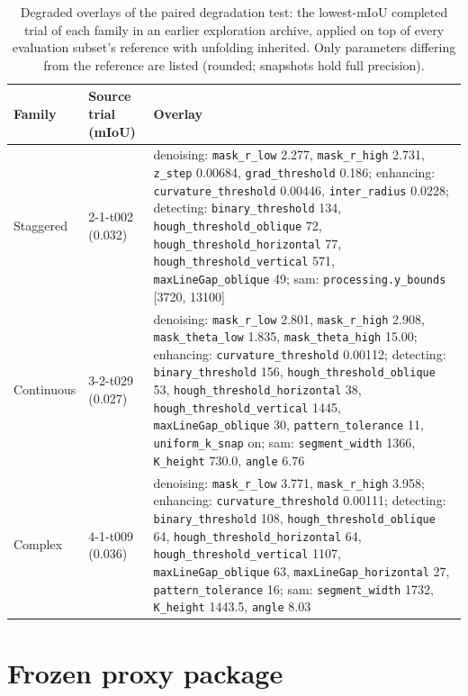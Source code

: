 \documentclass[a4paper,fleqn]{cas-dc}
\begin{document}
\begin{table}[t]
\caption{Degraded overlays of the paired degradation test: the lowest-mIoU completed trial of each family in an earlier exploration archive, applied on top of every evaluation subset's reference with unfolding inherited. Only parameters differing from the reference are listed (rounded; snapshots hold full precision).}
\label{tab:degraded-overlays}
\centering
\small
\begin{tabular*}{\textwidth}{@{\extracolsep{\fill}} l l Y{0.62\textwidth} @{}}
\toprule
Family & Source trial (mIoU) & Overlay \\
\midrule
Staggered & 2-1-t002 (0.032) & denoising: \texttt{mask\_r\_low} 2.277, \texttt{mask\_r\_high} 2.731, \texttt{z\_step} 0.00684, \texttt{grad\_threshold} 0.186; enhancing: \texttt{curvature\_threshold} 0.00446, \texttt{inter\_radius} 0.0228; detecting: \texttt{binary\_threshold} 134, \texttt{hough\_threshold\_oblique} 72, \texttt{hough\_threshold\_horizontal} 77, \texttt{hough\_threshold\_vertical} 571, \texttt{maxLineGap\_oblique} 49; sam: \texttt{processing.y\_bounds} [3720, 13100] \\
\addlinespace
Continuous & 3-2-t029 (0.027) & denoising: \texttt{mask\_r\_low} 2.801, \texttt{mask\_r\_high} 2.908, \texttt{mask\_theta\_low} 1.835, \texttt{mask\_theta\_high} 15.00; enhancing: \texttt{curvature\_threshold} 0.00112; detecting: \texttt{binary\_threshold} 156, \texttt{hough\_threshold\_oblique} 53, \texttt{hough\_threshold\_horizontal} 38, \texttt{hough\_threshold\_vertical} 1445, \texttt{maxLineGap\_oblique} 30, \texttt{pattern\_tolerance} 11, \texttt{uniform\_k\_snap} on; sam: \texttt{segment\_width} 1366, \texttt{K\_height} 730.0, \texttt{angle} 6.76 \\
\addlinespace
Complex & 4-1-t009 (0.036) & denoising: \texttt{mask\_r\_low} 3.771, \texttt{mask\_r\_high} 3.958; enhancing: \texttt{curvature\_threshold} 0.00111; detecting: \texttt{binary\_threshold} 108, \texttt{hough\_threshold\_oblique} 64, \texttt{hough\_threshold\_horizontal} 64, \texttt{hough\_threshold\_vertical} 1107, \texttt{maxLineGap\_oblique} 63, \texttt{maxLineGap\_horizontal} 27, \texttt{pattern\_tolerance} 16; sam: \texttt{segment\_width} 1732, \texttt{K\_height} 1443.5, \texttt{angle} 8.03 \\
\bottomrule
\end{tabular*}
\end{table}

\section{Frozen proxy package}\label{app:proxy-package}
\end{document}
